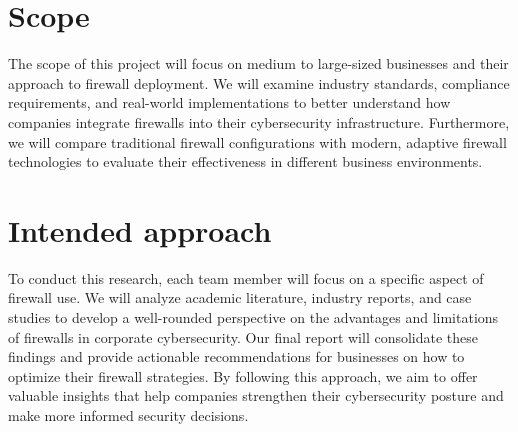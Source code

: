 \documentclass{article}
\begin{document}
\section{Scope}
The scope of this project will focus on medium to large-sized businesses and their approach to firewall deployment. We will examine industry standards, compliance requirements, and real-world implementations to better understand how companies integrate firewalls into their cybersecurity infrastructure. Furthermore, we will compare traditional firewall configurations with modern, adaptive firewall technologies to evaluate their effectiveness in different business environments.

\section{Intended approach}
To conduct this research, each team member will focus on a specific aspect of firewall use. We will analyze academic literature, industry reports, and case studies to develop a well-rounded perspective on the advantages and limitations of firewalls in corporate cybersecurity. Our final report will consolidate these findings and provide actionable recommendations for businesses on how to optimize their firewall strategies. By following this approach, we aim to offer valuable insights that help companies strengthen their cybersecurity posture and make more informed security decisions.



	
	
	
	
\end{document}
